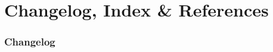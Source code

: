 \newcommand*{\addPackage}[1]{Added package \texttt{#1-ext}.}
\newcommand*{\addTikz}[1]{Added \tikzname\space library \texttt{ext.#1}.}
\newcommand*{\addPGF}[1]{Added \pgfname\space library \texttt{ext.#1}.}
\newcommand*{\addPGFkeys}[1]{Added \pgfname keys library \texttt{ext.#1}.}
\newcommand*{\addShape}[2][]{Added shape \texttt{\ifx\\#1\\#2\else#1\fi}\\(\pgfname\space library \texttt{ext.shapes.#2}).}
\part{Changelog, Index \& References}
\section*{Changelog}
